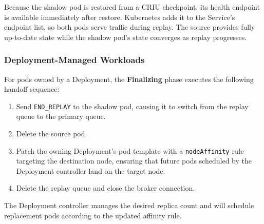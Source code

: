 \documentclass[conference]{IEEEtran}
\begin{document}
Because the shadow pod is restored from a CRIU checkpoint, its health endpoint
is available immediately after restore. Kubernetes adds it to the Service's
endpoint list, so both pods serve traffic during replay. The source provides
fully up-to-date state while the shadow pod's state converges as replay
progresses.

\subsubsection{Deployment-Managed Workloads}
\label{sec:shadowpod-deployment}

For pods owned by a Deployment, the \textbf{Finalizing} phase executes the
following handoff sequence:

\begin{enumerate}
\item Send \texttt{END\_REPLAY} to the shadow pod, causing it to switch
  from the replay queue to the primary queue.
\item Delete the source pod.
\item Patch the owning Deployment's pod template with a \texttt{nodeAffinity}
  rule targeting the destination node, ensuring that future pods scheduled by
  the Deployment controller land on the target node.
\item Delete the replay queue and close the broker connection.
\end{enumerate}

The Deployment controller manages the desired replica count and will
schedule replacement pods according to the updated affinity rule.
\end{document}
